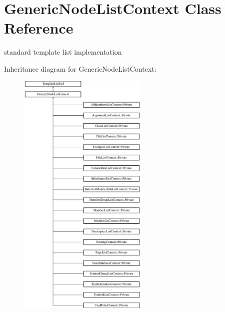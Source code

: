 \hypertarget{class_generic_node_list_context}{}\section{Generic\+Node\+List\+Context Class Reference}
\label{class_generic_node_list_context}


standard template list implementation  


Inheritance diagram for Generic\+Node\+List\+Context\+:\begin{figure}[H]
\begin{center}
\leavevmode
\includegraphics[height=12.000000cm]{class_generic_node_list_context}
\end{center}
\end{figure}

